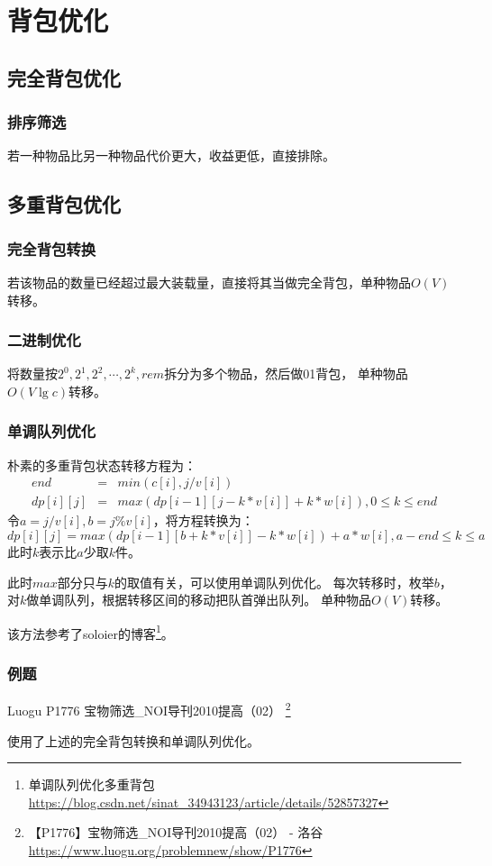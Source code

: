\section{背包优化}
\subsection{完全背包优化}
\subsubsection{排序筛选}
若一种物品比另一种物品代价更大，收益更低，直接排除。
\subsection{多重背包优化}
\subsubsection{完全背包转换}
若该物品的数量已经超过最大装载量，直接将其当做完全背包，单种物品$O(V)$转移。
\subsubsection{二进制优化}
将数量按$2^0,2^1,2^2,\cdots,2^k,rem$拆分为多个物品，然后做01背包，
单种物品$O(V\lg c)$转移。
\subsubsection{单调队列优化}
朴素的多重背包状态转移方程为：
\begin{eqnarray*}
    end&=&min(c[i],j/v[i])\\
    dp[i][j]&=&max(dp[i-1][j-k*v[i]]+k*w[i]),0\leq k \leq end
\end{eqnarray*}
令$a=j/v[i],b=j\%v[i]$，将方程转换为：
\begin{displaymath}
    dp[i][j]=max(dp[i-1][b+k*v[i]]-k*w[i])+a*w[i],a-end\leq k \leq a
\end{displaymath}
此时$k$表示比$a$少取$k$件。

此时$max$部分只与$k$的取值有关，可以使用单调队列优化。
每次转移时，枚举$b$，对$k$做单调队列，根据转移区间的移动把队首弹出队列。
单种物品$O(V)$转移。

该方法参考了soloier的博客\footnote{单调队列优化多重背包\\
\url{https://blog.csdn.net/sinat\_34943123/article/details/52857327}}。

\subsubsection{例题}
Luogu P1776 宝物筛选\_NOI导刊2010提高（02）
\footnote{【P1776】宝物筛选\_NOI导刊2010提高（02） - 洛谷
\url{https://www.luogu.org/problemnew/show/P1776}}

使用了上述的完全背包转换和单调队列优化。


